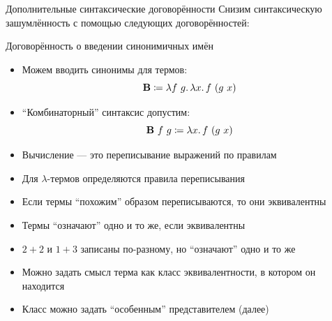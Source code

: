     \begin{frame}{Дополнительные синтаксические договорённости}
        Снизим синтаксическую зашумлённость с помощью следующих договорённостей:
        \begin{block}{Договорённость о введении синонимичных имён}
            \begin{itemize}
                \item Можем вводить синонимы для термов:
                \[
                    \mathbf{B} \coloneqq \lambda f ~ g\ldotp \lambda x\ldotp f~(g~x)
                \]
                \item ``Комбинаторный'' синтаксис допустим:
                \[
                    \mathbf{B} ~ f ~ g \coloneqq \lambda x\ldotp f~(g~x)
                \]
            \end{itemize}
        \end{block}
    \end{frame}


    \begin{frame}[fragile]{\subsecname \popslide}
        \pause
        \begin{itemize}
            \item Вычисление --- это переписывание выражений по правилам
            \item Для $\lambda$-термов определяются правила переписывания
            \item Если термы ``похожим'' образом переписываются, то они эквивалентны
            \item Термы ``означают'' одно и то же, если эквивалентны
            \item[\eg] $2+2$ и $1+3$ записаны по-разному, но ``означают'' одно и то же
            \item Можно задать смысл терма как класс эквивалентности, в котором он находится
            \item Класс можно задать ``особенным'' представителем (далее)
        \end{itemize}
    \end{frame}

